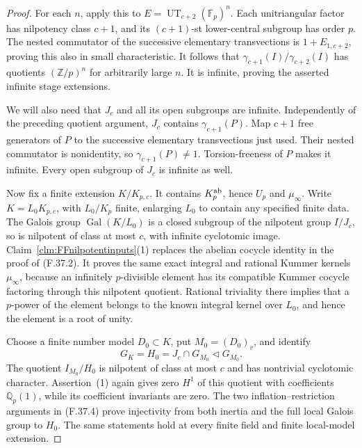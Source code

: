 \documentclass[11pt]{article}
\begin{document}
\begin{proof}
For each \(n\), apply this to
\(E=\operatorname{UT}_{c+2}(\mathbb F_p)^n\).
Each unitriangular factor has
nilpotency class \(c+1\), and
its \((c+1)\)-st lower-central
subgroup has order \(p\).
The nested commutator of the
successive elementary transvections
is \(1+E_{1,c+2}\), proving this
also in small characteristic.
It follows that
\(\gamma_{c+1}(I)/\gamma_{c+2}(I)\)
has quotients \((\mathbb Z/p)^n\)
for arbitrarily large \(n\).
It is infinite, proving the
asserted infinite stage extensions.

We will also need that \(J_c\)
and all its open subgroups are
infinite. Independently of the
preceding quotient argument,
\(J_c\) contains \(\gamma_{c+1}(P)\).
Map \(c+1\) free generators of
\(P\) to the successive elementary
transvections just used. Their
nested commutator is nonidentity,
so \(\gamma_{c+1}(P)\ne1\).
Torsion-freeness of \(P\) makes
it infinite. Every open subgroup
of \(J_c\) is infinite as well.

Now fix a finite extension
\(K/K_{p,c}\). It contains
\(K_p^{\rm ab}\), hence
\(U_p\) and \(\mu_\infty\).
Write \(K=L_0K_{p,c}\), with
\(L_0/K_p\) finite, enlarging
\(L_0\) to contain any specified
finite data. The Galois group
\(\operatorname{Gal}(K/L_0)\)
is a closed subgroup of the
nilpotent group \(I/J_c\),
so is nilpotent of class at most
\(c\), with infinite cyclotomic
image. Claim~\ref{clm:FFnilpotentinputs}(1)
replaces the abelian cocycle identity
in the proof of (F.37.2).
It proves the same exact integral
and rational Kummer kernels
\(\mu_\infty\), because an
infinitely \(p\)-divisible element
has its compatible Kummer cocycle
factoring through this nilpotent
quotient. Rational triviality there
implies that a \(p\)-power of
the element belongs to the known
integral kernel over \(L_0\),
and hence the element is a
root of unity.

Choose a finite number model
\(D_0\subset K\), put
\(M_0=(D_0)_v\), and identify
\[
        G_K=H_0=J_c\cap G_{M_0}
                         \triangleleft G_{M_0}.
                                                        \tag{F.39.3}
\]
The quotient \(I_{M_0}/H_0\)
is nilpotent of class at most
\(c\) and has nontrivial
cyclotomic character. Assertion~(1)
again gives zero \(H^1\) of this
quotient with coefficients
\(\mathbb Q_p(1)\), while its
coefficient invariants are zero.
The two inflation--restriction
arguments in (F.37.4) prove
injectivity from both inertia
and the full local Galois group
to \(H_0\). The same statements
hold at every finite field and
finite local-model extension.


\end{proof}
\end{document}
